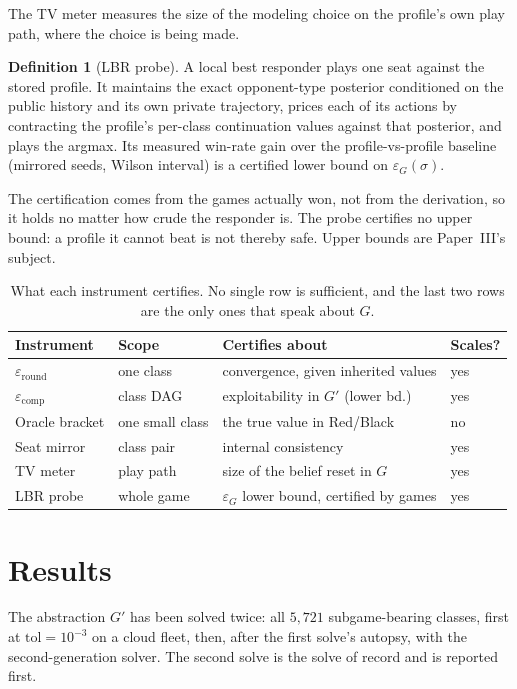 \documentclass[11pt]{article}
\theoremstyle{plain}
\theoremstyle{definition}
\newtheorem{definition}[theorem]{Definition}
\theoremstyle{remark}
\newcommand{\game}{\ensuremath{G}}
\newcommand{\gp}{\ensuremath{G'}}
\newcommand{\epsG}{\ensuremath{\varepsilon_{\game}}}
\begin{document}
The TV meter measures the size of the modeling choice on the profile's own play
path, where the choice is being made.

\begin{definition}[LBR probe]\label{def:lbr}
A local best responder \cite{lisy2017} plays one seat against the
stored profile. It maintains the exact opponent-type posterior
conditioned on the public history and its own private trajectory,
prices each of its actions by contracting the profile's per-class
continuation values against that posterior, and plays the argmax. Its
measured win-rate gain over the profile-vs-profile baseline (mirrored
seeds, Wilson interval) is a certified lower bound on
$\epsG(\sigma)$.
\end{definition}

The certification comes from the games actually won, not from the derivation, so
it holds no matter how crude the responder is. The probe certifies no upper
bound: a profile it cannot beat is not thereby safe. Upper bounds are
Paper~III's subject.

\begin{table}[htbp]
\centering
\caption{What each instrument certifies. No single row is sufficient,
and the last two rows are the only ones that speak about $\game$.}
\label{tab:meters}
\begin{tabular}{@{}llll@{}}
\toprule
Instrument & Scope & Certifies about & Scales?\\
\midrule
$\varepsilon_{\text{round}}$ & one class & convergence, given inherited values & yes\\
$\varepsilon_{\text{comp}}$ & class DAG & exploitability in $\gp$ (lower bd.) & yes\\
Oracle bracket & one small class & the true value in Red/Black & no\\
Seat mirror & class pair & internal consistency & yes\\
TV meter & play path & size of the belief reset in $\game$ & yes\\
LBR probe & whole game & $\epsG$ lower bound, certified by games & yes\\
\bottomrule
\end{tabular}
\end{table}

\section{Results}\label{sec:results}

The abstraction $\gp$ has been solved twice: all $5{,}721$ subgame-bearing
classes, first at $\mathrm{tol}=10^{-3}$ on a cloud fleet, then, after the first
solve's autopsy, with the second-generation solver. The second solve is the
solve of record and is reported first.
\end{document}
